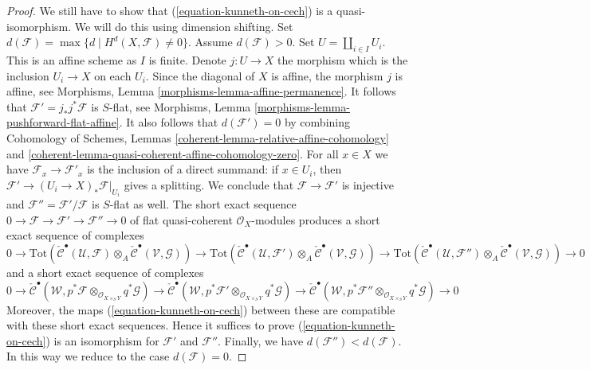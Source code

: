 \documentclass{stacks-project}
\theoremstyle{plain}
\theoremstyle{definition}
\theoremstyle{remark}
\numberwithin{equation}{subsection}
\begin{document}
\begin{proof}
\medskip\noindent
We still have to show that (\ref{equation-kunneth-on-cech})
is a quasi-isomorphism. We will do this using dimension shifting.
Set $d(\mathcal{F}) = \max \{d \mid H^d(X, \mathcal{F}) \not = 0\}$.
Assume $d(\mathcal{F}) > 0$. Set $U = \coprod\nolimits_{i \in I} U_i$.
This is an affine scheme as $I$ is finite. Denote
$j : U \to X$ the morphism which is the inclusion $U_i \to X$
on each $U_i$. Since the diagonal of $X$ is affine, the morphism
$j$ is affine, see
Morphisms, Lemma \ref{morphisms-lemma-affine-permanence}.
It follows that $\mathcal{F}' = j_*j^*\mathcal{F}$ is $S$-flat, see
Morphisms, Lemma \ref{morphisms-lemma-pushforward-flat-affine}.
It also follows that $d(\mathcal{F}') = 0$ by combining
Cohomology of Schemes, Lemmas
\ref{coherent-lemma-relative-affine-cohomology} and
\ref{coherent-lemma-quasi-coherent-affine-cohomology-zero}.
For all $x \in X$ we have $\mathcal{F}_x  \to \mathcal{F}'_x$
is the inclusion of a direct summand: if $x \in U_i$,
then $\mathcal{F}' \to (U_i \to X)_*\mathcal{F}|_{U_i}$
gives a splitting. We conclude that
$\mathcal{F} \to \mathcal{F}'$ is injective and
$\mathcal{F}'' = \mathcal{F}'/\mathcal{F}$
is $S$-flat as well. The short exact sequence
$0 \to \mathcal{F} \to \mathcal{F}' \to \mathcal{F}'' \to 0$
of flat quasi-coherent $\mathcal{O}_X$-modules
produces a short exact sequence of complexes
$$
0 \to
\text{Tot}(
\check{\mathcal{C}}^\bullet(\mathcal{U}, \mathcal{F})
\otimes_A
\check{\mathcal{C}}^\bullet(\mathcal{V}, \mathcal{G})) \to
\text{Tot}(
\check{\mathcal{C}}^\bullet(\mathcal{U}, \mathcal{F}')
\otimes_A
\check{\mathcal{C}}^\bullet(\mathcal{V}, \mathcal{G})) \to
\text{Tot}(
\check{\mathcal{C}}^\bullet(\mathcal{U}, \mathcal{F}'')
\otimes_A
\check{\mathcal{C}}^\bullet(\mathcal{V}, \mathcal{G})) \to 0
$$
and a short exact sequence of complexes
$$
0 \to
\check{\mathcal{C}}^\bullet(\mathcal{W},
p^*\mathcal{F}
\otimes_{\mathcal{O}_{X \times_S Y}}
q^*\mathcal{G}) \to
\check{\mathcal{C}}^\bullet(\mathcal{W},
p^*\mathcal{F}'
\otimes_{\mathcal{O}_{X \times_S Y}}
q^*\mathcal{G}) \to
\check{\mathcal{C}}^\bullet(\mathcal{W},
p^*\mathcal{F}''
\otimes_{\mathcal{O}_{X \times_S Y}}
q^*\mathcal{G}) \to 0
$$
Moreover, the maps (\ref{equation-kunneth-on-cech}) between these are
compatible with these short exact sequences. Hence it suffices to prove
(\ref{equation-kunneth-on-cech})
is an isomorphism for $\mathcal{F}'$ and $\mathcal{F}''$. Finally,
we have $d(\mathcal{F}'') < d(\mathcal{F})$.
In this way we reduce to the case $d(\mathcal{F}) = 0$.


\end{proof}
\end{document}
